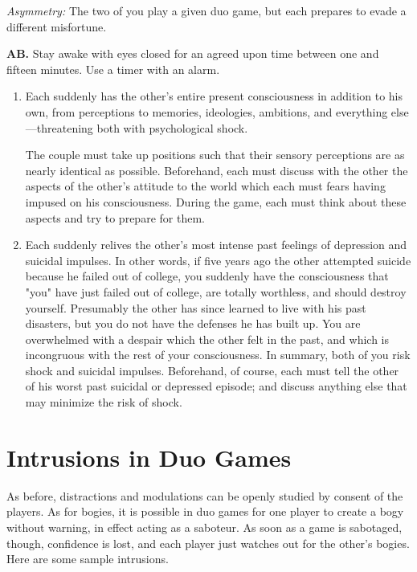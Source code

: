 \documentclass[10pt,twoside,draft]{memoir}
\begin{document}
{{\emph{Asymmetry:} The two of you play a given duo game, but each prepares 
to evade a different misfortune. 

\textbf{AB.} Stay awake with eyes closed for an agreed upon time between one 
and fifteen minutes. Use a timer with an alarm. 

\begin{enumerate}
\item Each suddenly has the other's entire present consciousness in addition to 
his own, from perceptions to memories, ideologies, ambitions, and 
everything else---threatening both with psychological shock. 

The couple must take up positions such that their sensory perceptions 
are as nearly identical as possible. Beforehand, each must discuss with the 
other the aspects of the other's attitude to the world which each must fears 
having impused on his consciousness. During the game, each must think 
about these aspects and try to prepare for them. 

\item Each suddenly relives the other's most intense past feelings of depression 
and suicidal impulses. In other words, if five years ago the other attempted 
suicide because he failed out of college, you suddenly have the consciousness 
that "you" have just failed out of college, are totally worthless, and should 
destroy yourself. Presumably the other has since learned to live with his past 
disasters, but you do not have the defenses he has built up. You are 
overwhelmed with a despair which the other felt in the past, and which is 
incongruous with the rest of your consciousness. In summary, both of you 
risk shock and suicidal impulses. Beforehand, of course, each must tell the 
other of his worst past suicidal or depressed episode; and discuss anything 
else that may minimize the risk of shock. 
\end{enumerate}

\section*{Intrusions in Duo Games}

As before, distractions and modulations can be openly studied by 
consent of the players. As for bogies, it is possible in duo games for one 
player to create a bogy without warning, in effect acting as a saboteur. As 
soon as a game is sabotaged, though, confidence is lost, and each player just 
watches out for the other's bogies. Here are some sample intrusions. 

}}
\end{document}
